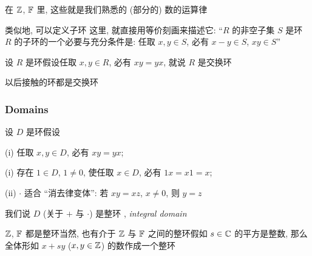 \begin{example}
    在 $\mathbb{Z}$, $\mathbb{F}$ 里, 这些就是我们熟悉的 (部分的) 数的运算律\period
\end{example}

\begin{remark}
    类似地, 可以定义子环 \period 这里, 就直接用等价刻画来描述它: ``$R$ 的非空子集 $S$ 是环 $R$ 的子环的一个必要与充分条件是: 任取 $x,y \in S$, 必有 $x-y \in S$, $xy \in S$\period ''
\end{remark}

\begin{definition}
    设 $R$ 是环\period 假设任取 $x,y \in R$, 必有 $xy = yx$, 就说 $R$ 是交换环 \period
\end{definition}

\begin{remark}
    以后接触的环都是交换环\period
\end{remark}

\subsubsection*{Domains}

\begin{definition}
    设 $D$ 是环\period 假设

    (i) 任取 $x,y \in D$, 必有 $xy = yx$;

    (i) 存在 $1 \in D$, $1 \neq 0$, 使任取 $x \in D$, 必有 $1x = x1 = x$;

    (ii) $\cdot$ 适合 ``消去律变体'': 若 $xy = xz$, $x \neq 0$, 则 $y = z$\period

    我们说 $D$ (关于 $+$ 与 $\cdot$) 是整环 , \textit{integral domain}\period
\end{definition}

\begin{example}
    $\mathbb{Z}$, $\mathbb{F}$ 都是整环\period 当然, 也有介于 $\mathbb{Z}$ 与 $\mathbb{F}$ 之间的整环\period 假如 $s \in \mathbb{C}$ 的平方是整数, 那么全体形如 $x + sy$ ($x,y \in \mathbb{Z}$) 的数作成一个整环\period
\end{example}

